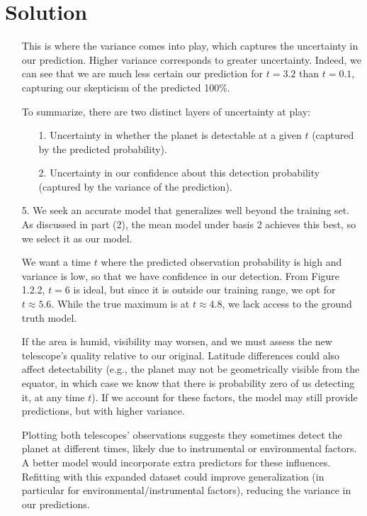 \documentclass[submit]{../harvardml}
\newenvironment{solution}
  {\color{blue}\section*{Solution}}
{}
\begin{document}
\begin{solution}
\begin{enumerate}
    \vspace{.5em}
    This is where the variance comes into play, which captures the uncertainty in our prediction. Higher variance corresponds to greater uncertainty. Indeed, we can see that we are much less certain our prediction for $t=3.2$ than $t=0.1$, capturing our skepticism of the predicted 100\%.
    
    \vspace{.5em}
    To summarize, there are two distinct layers of uncertainty at play:
    \begin{enumerate}
        \item [1.] Uncertainty in whether the planet is detectable at a given $t$ (captured by the predicted probability).
        \item [2.] Uncertainty in our confidence about this detection probability (captured by the variance of the prediction).
    \end{enumerate}

    \item [5.] We seek an accurate model that generalizes well beyond the training set. As discussed in part (2), the mean model under basis 2 achieves this best, so we select it as our model.

    \vspace{.5em}
We want a time $t$ where the predicted observation probability is high and variance is low, so that we have confidence in our detection. From Figure 1.2.2, $t=6$ is ideal, but since it is outside our training range, we opt for $t \approx 5.6$. While the true maximum is at $t \approx 4.8$, we lack access to the ground truth model.

    \vspace{.5em}
    If the area is humid, visibility may worsen, and we must assess the new telescope’s quality relative to our original. Latitude differences could also affect detectability (e.g., the planet may not be geometrically visible from the equator, in which case we know that there is probability zero of us detecting it, at any time $t$). If we account for these factors, the model may still provide predictions, but with higher variance.

    \vspace{.5em}
    Plotting both telescopes’ observations suggests they sometimes detect the planet at different times, likely due to instrumental or environmental factors. A better model would incorporate extra predictors for these influences. Refitting with this expanded dataset could improve generalization (in particular for environmental/instrumental factors), reducing the variance in our predictions.
\end{enumerate}
\end{solution}
\end{document}
